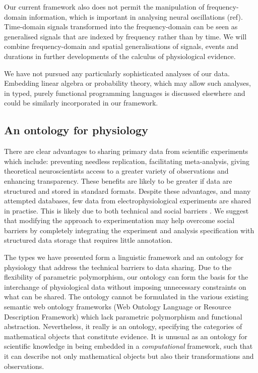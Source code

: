 Our current framework also does not permit the manipulation of
frequency-domain information, which is important in analysing neural
oscillations (ref). Time-domain signals transformed into the
frequency-domain can be seen as generalised signals that are indexed
by frequency rather than by time. We will combine frequency-domain and
spatial generalisations of signals, events and durations in further
developments of the calculus of physiological evidence.

We have not pursued any particularly sophisticated analyses of our
data. Embedding linear algebra or probability theory, which may allow
such analyses, in typed, purely functional programming languages is
discussed elsewhere \citep{Eaton2006, Park2005} and could be similarly
incorporated in our framework.

\subsection*{An ontology for physiology}

There are clear advantages to sharing primary data from scientific
experiments \citep{Insel2003} which include: preventing needless replication,
facilitating meta-analysis, giving theoretical neuroscientists access
to a greater variety of observations and enhancing transparency. These
benefits are likely to be greater if data are structured and stored in
standard formats. Despite these advantages, and many attempted
databases, few data from electrophysiological experiments are
shared in practise. This is likely due to both technical and social
barriers \citep{Amari2002}. We suggest that modifying the approach to
experimentation may help overcome social barriers by completely
integrating the experiment and analysis specification with structured
data storage that requires little annotation.

The types we have presented form a linguistic framework and an
ontology for physiology that address the technical barriers to data
sharing. Due to the flexibility of parametric polymorphism, our
ontology can form the basis for the interchange of physiological data
without imposing unnecessary constraints on what can be shared. The
ontology cannot be formulated in the various existing semantic web
ontology frameworks (Web Ontology Language or Resource Description
Framework) which lack parametric polymorphism and functional
abstraction. Nevertheless, it really is an ontology, specifying the
categories of mathematical objects that constitute evidence. It is
unusual as an ontology for scientific knowledge in being embedded in a
\emph{computational} framework, such that it can describe not only
mathematical objects but also their transformations and observations.

